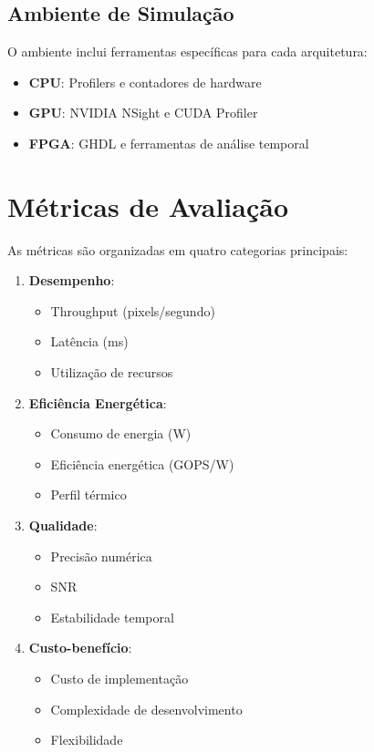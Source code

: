 \subsection{Ambiente de Simulação}
O ambiente inclui ferramentas específicas para cada arquitetura:

\begin{itemize}
    \item \textbf{CPU}: Profilers e contadores de hardware
    \item \textbf{GPU}: NVIDIA NSight e CUDA Profiler
    \item \textbf{FPGA}: GHDL e ferramentas de análise temporal
\end{itemize}

\section{Métricas de Avaliação}\label{sec:metricas}

As métricas são organizadas em quatro categorias principais:

\begin{enumerate}
    \item \textbf{Desempenho}:
    \begin{itemize}
        \item Throughput (pixels/segundo)
        \item Latência (ms)
        \item Utilização de recursos
    \end{itemize}
    
    \item \textbf{Eficiência Energética}:
    \begin{itemize}
        \item Consumo de energia (W)
        \item Eficiência energética (GOPS/W)
        \item Perfil térmico
    \end{itemize}
    
    \item \textbf{Qualidade}:
    \begin{itemize}
        \item Precisão numérica
        \item SNR
        \item Estabilidade temporal
    \end{itemize}
    
    \item \textbf{Custo-benefício}:
    \begin{itemize}
        \item Custo de implementação
        \item Complexidade de desenvolvimento
        \item Flexibilidade
    \end{itemize}
\end{enumerate}

